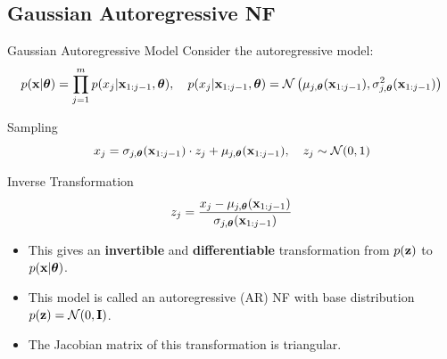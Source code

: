 \documentclass{beamer}
\begin{document}
\subsection{Gaussian Autoregressive NF}
\begin{frame}{Gaussian Autoregressive Model}
	Consider the autoregressive model:
	\vspace{-0.3cm}
	{\small
		\[
		p(\mathbf{x} | \boldsymbol{\theta}) = \prod_{j=1}^m p(x_j | \mathbf{x}_{1:j-1}, \boldsymbol{\theta}), \quad
		p(x_j | \mathbf{x}_{1:j-1}, \boldsymbol{\theta}) = \mathcal{N} \left(\mu_{j, \boldsymbol{\theta}}(\mathbf{x}_{1:j-1}), \sigma^2_{j, \boldsymbol{\theta}} (\mathbf{x}_{1:j-1})\right)
		\]
	}
	\vspace{-0.5cm}
	\eqpause
	\begin{block}{Sampling}
		\vspace{-0.3cm}
		\[
		x_j = \sigma_{j, \boldsymbol{\theta}} (\mathbf{x}_{1:j-1}) \cdot z_j + \mu_{j, \boldsymbol{\theta}}(\mathbf{x}_{1:j-1}), \quad z_j \sim \mathcal{N}(0, 1)
		\]
		\vspace{-0.7cm}
	\end{block}
	\eqpause
	\begin{block}{Inverse Transformation}
		\vspace{-0.5cm}
		\[
		z_j = \frac{x_j - \mu_{j, \boldsymbol{\theta}}(\mathbf{x}_{1:j-1})}{\sigma_{j, \boldsymbol{\theta}} (\mathbf{x}_{1:j-1}) }
		\]
		\vspace{-0.4cm}
	\end{block}
	\eqpause
	\begin{itemize}
		\item This gives an \textbf{invertible} and \textbf{differentiable} transformation from $p(\mathbf{z})$ to $p(\mathbf{x} | \boldsymbol{\theta})$.
		    \eqpause
		\item This model is called an autoregressive (AR) NF with base distribution $p(\mathbf{z}) = \mathcal{N}(0, \mathbf{I})$.
		    \eqpause
		\item The Jacobian matrix of this transformation is triangular.
	\end{itemize}
\end{frame}
\end{document}
